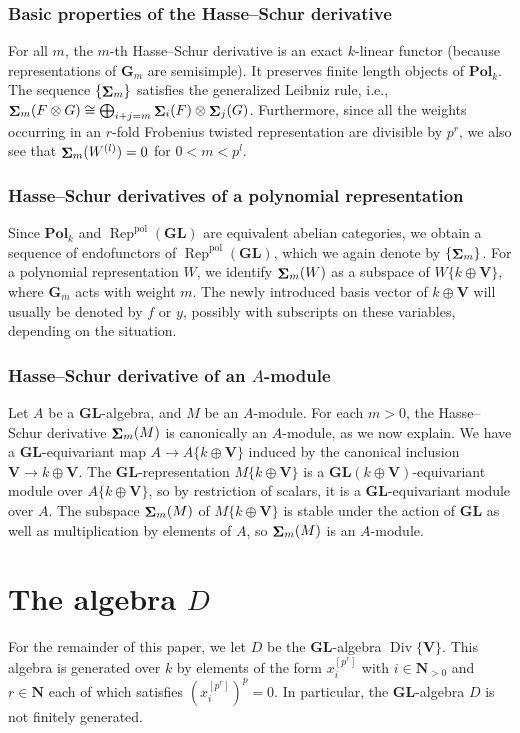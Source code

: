 \documentclass[12pt]{amsart}
\newcommand{\bG}{\mathbf{G}}
\newcommand{\bN}{\mathbf{N}}
\newcommand{\bV}{\mathbf{V}}
\DeclareMathOperator{\Div}{Div}
\newcommand{\pol}{\mathrm{pol}}
\newcommand{\Pol}{\mathbf{Pol}_k}
\DeclareMathOperator{\Sh}{\bf{\Sigma}}
\DeclareMathOperator{\Rep}{Rep}
\newcommand{\GL}{\mathbf{GL}}
\numberwithin{equation}{section}
\theoremstyle{definition}
\theoremstyle{plain}
\begin{document}
\subsubsection{Basic properties of the Hasse--Schur derivative}
For all $m$, the $m$-th Hasse--Schur derivative is an exact $k$-linear functor (because representations of $\bG_m$ are semisimple). It preserves finite length objects of $\Pol$. The sequence $\{\Sh_m\}$  satisfies the generalized Leibniz rule, i.e., $\Sh_m(F\otimes G) \cong \bigoplus_{i+j = m} \Sh_i(F) \otimes \Sh_j(G)$. Furthermore, since all the weights occurring in an $r$-fold Frobenius twisted representation are divisible by $p^r$, we also see that $\Sh_m(W^{(l)}) = 0$ for $0 < m < p^l$.


\subsubsection{Hasse--Schur derivatives of a polynomial representation}Since $\Pol$ and $\Rep^\pol(\GL)$ are equivalent abelian categories, we obtain a sequence of endofunctors of $\Rep^\pol(\GL)$, which we again denote by $\{\Sh_m \}$. For a polynomial representation $W$, we identify $\Sh_m(W)$ as a subspace of $W\{k \oplus \bV\}$, where $\bG_m$ acts with weight $m$. The newly introduced basis vector of $k \oplus \bV$ will usually be denoted by $f$ or $y$, possibly with subscripts on these variables, depending on the situation. 


\subsubsection{Hasse--Schur derivative of an \texorpdfstring{$A$}{A}-module} Let $A$ be a $\GL$-algebra, and $M$ be an $A$-module. For each $m > 0$, the Hasse--Schur derivative $\Sh_m(M)$ is canonically an $A$-module, as we now explain. We have a $\GL$-equivariant map $A \to A\{k \oplus \bV\}$ induced by the canonical inclusion $\bV \to k \oplus \bV$. The $\GL$-representation $M\{k \oplus \bV\}$ is a $\GL(k \oplus \bV)$-equivariant module over $A\{k \oplus \bV\}$, so by restriction of scalars, it is a $\GL$-equivariant module over $A$. The subspace $\Sh_m(M)$ of $M\{k \oplus \bV\}$ is stable under the action of $\GL$ as well as multiplication by elements of $A$, so $\Sh_m(M)$ is an $A$-module.




\section{The algebra \texorpdfstring{$D$}{D}} \label{s:dmodules}
For the remainder of this paper, we let $D$ be the $\GL$-algebra $\Div\{\bV\}$. This algebra is generated over $k$ by elements of the form $x_i^{[p^r]}$ with $i \in \bN_{>0}$ and $r \in \bN$ each of which satisfies $(x_i^{[p^r]})^p = 0$. In particular, the $\GL$-algebra $D$ is not finitely generated.
\end{document}
